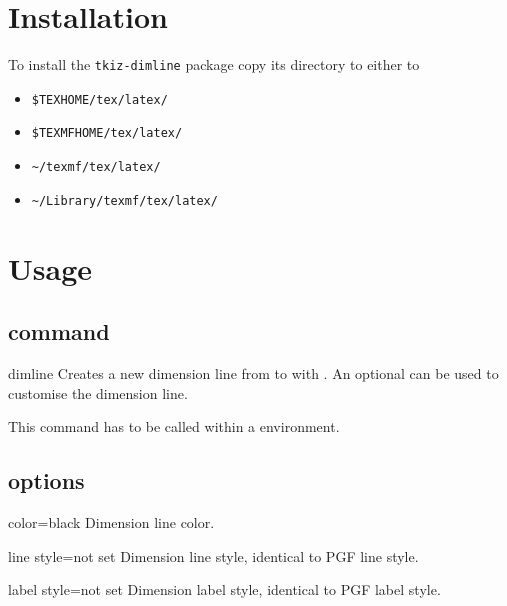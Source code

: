\documentclass[a4paper]{article}
\newcommand{\PGF}{\textsc{PGF}}
\begin{document}
\let\thefootnote\relax{}


\newpage


\section{Installation}

To install the \verb"tkiz-dimline" package copy its directory to either to
\begin{itemize}
\item \verb"$TEXHOME/tex/latex/"
\item \verb"$TEXMFHOME/tex/latex/"
\item \verb"~/texmf/tex/latex/"
\item \verb"~/Library/texmf/tex/latex/"
\end{itemize}

\section{Usage}

\subsection{command}
\begin{docCommand}{dimline}{}
  Creates a new dimension line from  to  with
  . An optional  can be used to customise the
  dimension line.

  This command has to be called within a 
  environment.

\end{docCommand}

\subsection{options}
\begin{docKey}{color}{=}{black}
  Dimension line color.
\end{docKey}
\begin{docKey}{line style}{=}{not set}
  Dimension line style, identical to {\PGF} line style.
\end{docKey}
\begin{docKey}{label style}{=}{not set}
  Dimension label style, identical to {\PGF} label style.
\end{docKey}
\end{document}
